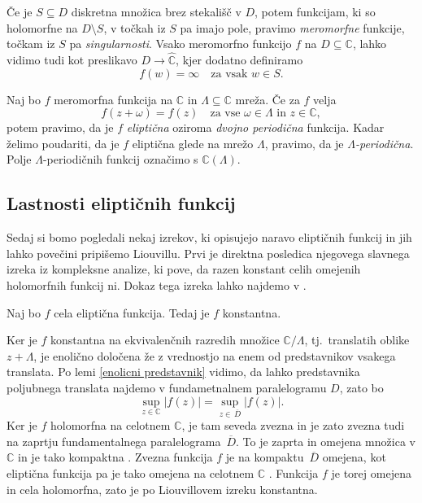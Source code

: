 \documentclass[mat1]{fmfdelo}
\numberwithin{equation}{section}
\newcommand{\C}{\mathbb C}
\newcommand{\RS}{\widehat{\C}}
\newcommand{\om}{\omega}
\newcommand{\olsi}[1]{\,\overline{\!{#1}}} %
\newcommand{\tj}{tj.\ }
\theoremstyle{definition}
\begin{document}
Če je $S \subseteq D$ diskretna množica brez stekališč v $D$, potem funkcijam, ki so holomorfne na $D \setminus S$, v točkah iz $S$ pa imajo pole, pravimo \emph{meromorfne} funkcije, točkam iz $S$ pa \emph{singularnosti}. Vsako meromorfno funkcijo $f$ na $D \subseteq \C$, lahko vidimo tudi kot preslikavo $D \to \RS$, kjer dodatno definiramo 
\[
    f(w) = \infty \quad \text{za vsak $w \in S$.} 
\]

\begin{definicija}
    Naj bo $f$ meromorfna funkcija na $\C$ in $\Lambda \subseteq \C$ mreža. Če za $f$ velja
    \[
        f(z + \om) = f(z) \quad \text{za vse $\om \in \Lambda$ in $z \in \C$},
    \]
    potem pravimo, da je $f$ \emph{eliptična} oziroma \emph{dvojno periodična} funkcija. Kadar želimo poudariti, da je $f$ eliptična glede na mrežo $\Lambda$, pravimo, da je \emph{$\Lambda$-periodična}. Polje $\Lambda$-periodičnih funkcij označimo s $\C(\Lambda)$. %
\end{definicija}





\subsection{Lastnosti eliptičnih funkcij}

Sedaj si bomo pogledali nekaj izrekov, ki opisujejo naravo eliptičnih funkcij in jih lahko povečini pripišemo Liouvillu. Prvi je direktna posledica njegovega slavnega izreka iz kompleksne analize, ki pove, da razen konstant celih omejenih holomorfnih funkcij ni. Dokaz tega izreka lahko najdemo v \cite[izrek 59]{Globevnik}.

\begin{izrek}
    \label{cele el. funkcije}
    Naj bo $f$ cela eliptična funkcija. Tedaj je $f$ konstantna.
\end{izrek}

\begin{dokaz}
    Ker je $f$ konstantna na ekvivalenčnih razredih množice $\C/\Lambda$, \tj translatih oblike $z + \Lambda$, je enolično določena že z vrednostjo na enem od predstavnikov vsakega translata. Po lemi \ref{enolicni predstavnik} vidimo, da lahko predstavnika poljubnega translata najdemo v fundametnalnem paralelogramu $D$, zato bo 
    \[
        \sup_{z \in \C} \left\lvert f(z) \right\rvert = \sup_{z \in \olsi{D}} \left\lvert f(z) \right\rvert.
    \]
    Ker je $f$ holomorfna na celotnem $\C$, je tam seveda zvezna in je zato zvezna tudi na zaprtju fundamentalnega paralelograma $\olsi{D}$. To je zaprta in omejena množica v $\C$ in je tako kompaktna \cite[trditev 2.22]{MrcunTop}. Zvezna funkcija $f$ je na kompaktu $\olsi{D}$ omejena, kot eliptična funkcija pa je tako omejena na celotnem $\C$ \cite[posledica 2.28]{MrcunTop}. Funkcija $f$ je torej omejena in cela holomorfna, zato je po Liouvillovem izreku konstantna.  
\end{dokaz}
\end{document}
